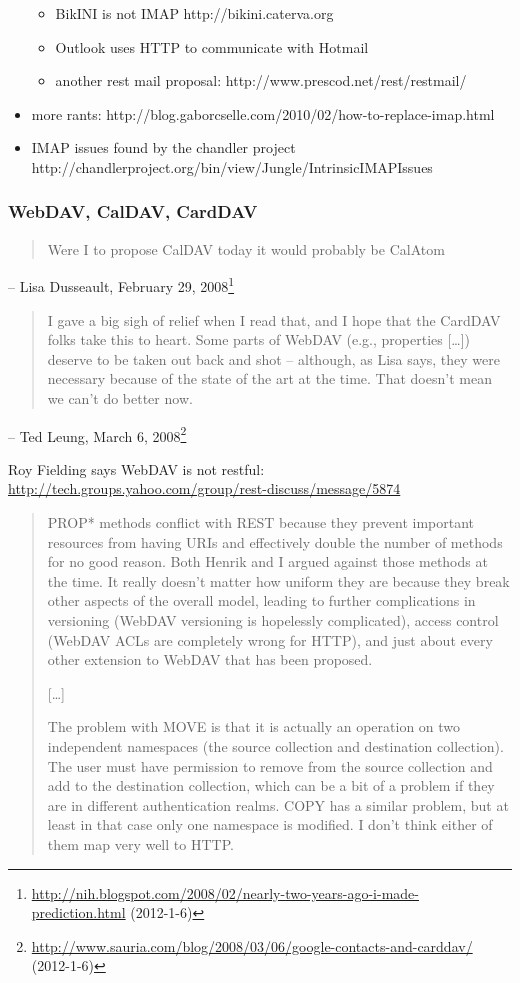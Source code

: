 \documentclass[12pt,a4paper]{scrartcl}		%
\newcommand{\citeurl}[2]{\url{#1} (#2)}
\begin{document}
\begin{itemize}
\begin{itemize}
  \item BikINI is not IMAP http://bikini.caterva.org
  \item Outlook uses HTTP to communicate with Hotmail
  \item another rest mail proposal: http://www.prescod.net/rest/restmail/
  \end{itemize}
\item more rants: http://blog.gaborcselle.com/2010/02/how-to-replace-imap.html
\item IMAP issues found by the chandler project http://chandlerproject.org/bin/view/Jungle/IntrinsicIMAPIssues
\end{itemize}



\subsubsection{WebDAV, CalDAV, CardDAV}

\begin{quote}
Were I to propose CalDAV today it would probably be CalAtom  
\end{quote}
-- Lisa Dusseault, February 29, 2008\footnote{\citeurl{http://nih.blogspot.com/2008/02/nearly-two-years-ago-i-made-prediction.html}{2012-1-6}}

\begin{quote}
  I gave a big sigh of relief when I read that, and I hope that the CardDAV
  folks take this to heart. Some parts of WebDAV (e.g., properties [\ldots])
  deserve to be taken out back and shot -- although, as Lisa says, they were
  necessary because of the state of the art at the time. That doesn't mean we
  can't do better now.
\end{quote}
-- Ted Leung, March 6, 2008\footnote{\citeurl{http://www.sauria.com/blog/2008/03/06/google-contacts-and-carddav/}{2012-1-6}}


Roy Fielding says WebDAV is not restful: \url{http://tech.groups.yahoo.com/group/rest-discuss/message/5874}

\begin{quotation}
PROP* methods conflict with REST because they prevent
important resources from having URIs and effectively double the
number of methods for no good reason. Both Henrik and I argued
against those methods at the time. It really doesn't matter
how uniform they are because they break other aspects of the
overall model, leading to further complications in versioning
(WebDAV versioning is hopelessly complicated), access control
(WebDAV ACLs are completely wrong for HTTP), and just about every
other extension to WebDAV that has been proposed.

[\ldots]

The problem with MOVE is that it is actually an operation on two
independent namespaces (the source collection and destination
collection). The user must have permission to remove from the
source collection and add to the destination collection, which
can be a bit of a problem if they are in different authentication
realms. COPY has a similar problem, but at least in that case
only one namespace is modified. I don't think either of them map
very well to HTTP.
\end{quotation}
\end{document}
